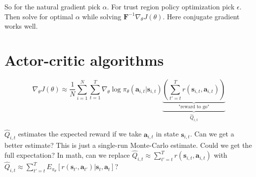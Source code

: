 \documentclass{report}
\begin{document}
So for the natural gradient pick $\alpha$.
For trust region policy optimization pick $\epsilon$.
Then solve for optimal $\alpha$ while solving $\bm{F}^{-1} \nabla_\theta J(\theta)$.
Here conjugate gradient works well.


\chapter{Actor-critic algorithms}

\begin{equation}
		\nabla_\theta J(\theta) \approx 
		\frac{1}{N} \sum_{i=1}^{N} \sum_{t=1}^{T} \nabla_\theta \log \pi_\theta (\bm{a}_{i,t}| \bm{s}_{i,t})
		\underbrace{\underbrace{\left ( \sum_{t'=t}^{T} r (\bm{s}_{i,t}, \bm{a}_{i,t}) \right )}_{\text{"reward to go"}}}_{\hat{Q}_{i,t}}
\end{equation}

$\hat{Q}_{i,t}$ estimates the expected reward if we take $\bm{a}_{i,t}$ in state $\bm{s}_{i,t}$.
Can we get a better estimate? This is just a single-run Monte-Carlo estimate.
Could we get the full expectation?
In math, can we replace $\hat{Q}_{i,t} \approx  \sum_{t'=t}^{T} r (\bm{s}_{i,t}, \bm{a}_{i,t}) $ with 
$\hat{Q}_{i,t} \approx  \sum_{t'=t}^{T} E_{\pi_\theta} \left[ r(\bm{s}_{t'}, \bm{a}_{t'}) |\bm{s}_{t}, \bm{a}_{t}  \right]   $?
\end{document}
